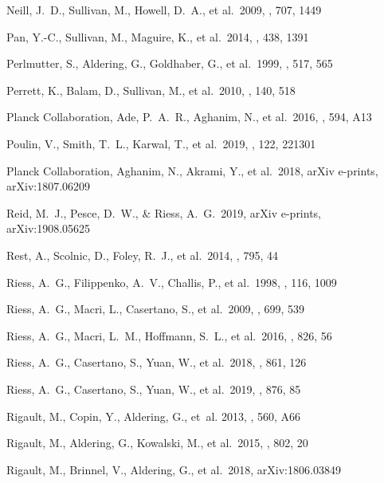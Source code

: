 \documentclass[]{aa} %
\begin{document}
\begin{thebibliography}{}
 Neill, J.~D., Sullivan, M., Howell, D.~A., et al.\ 2009, \apj, 707, 1449

 Pan, Y.-C., Sullivan, M., Maguire, K., et al.\ 2014, \mnras, 438, 1391

 Perlmutter, S., Aldering, G., Goldhaber, G., et al.\ 1999, \apj, 517, 565

 Perrett, K., Balam, D., Sullivan, M., et al.\ 2010, \aj, 140, 518

 Planck Collaboration, Ade, P.~A.~R., Aghanim, N., et al.\ 2016, \aap, 594, A13

 Poulin, V., Smith, T.~L., Karwal, T., et al.\ 2019, \prl, 122, 221301

 Planck Collaboration, Aghanim, N., Akrami, Y., et al.\ 2018, arXiv e-prints, arXiv:1807.06209

 Reid, M.~J., Pesce, D.~W., \& Riess, A.~G.\ 2019, arXiv e-prints, arXiv:1908.05625

 Rest, A., Scolnic, D., Foley, R.~J., et al.\ 2014, \apj, 795, 44

 Riess, A.~G., Filippenko, A.~V., Challis, P., et al.\ 1998, \aj, 116, 1009

 Riess, A.~G., Macri, L., Casertano, S., et al.\ 2009, \apj, 699, 539

 Riess, A.~G., Macri, L.~M., Hoffmann, S.~L., et al.\ 2016, \apj, 826, 56

 Riess, A.~G., Casertano, S., Yuan, W., et al.\ 2018, \apj, 861, 126

 Riess, A.~G., Casertano, S., Yuan, W., et al.\ 2019, \apj, 876, 85

Rigault, M., Copin, Y., Aldering, G., {et~al.} 2013, \aap, 560, A66

 Rigault, M., Aldering, G., Kowalski, M., et al.\ 2015, \apj, 802, 20

 Rigault, M.,
  Brinnel, V., Aldering, G., et al.\ 2018, arXiv:1806.03849


\end{thebibliography}
\end{document}
